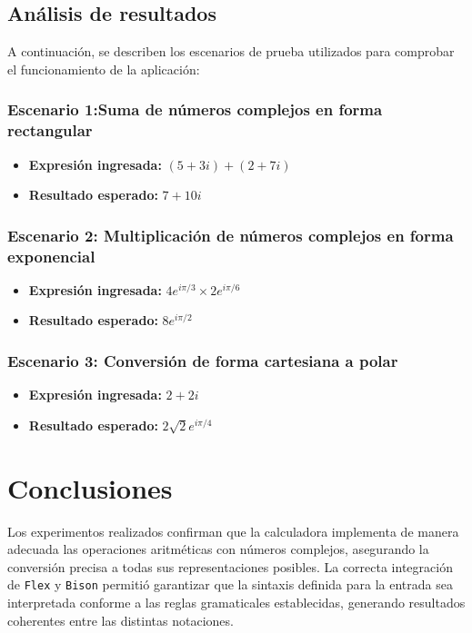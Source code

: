 \documentclass{article}
\begin{document}
\subsection{Análisis de resultados}

A continuación, se describen los escenarios de prueba utilizados para comprobar el funcionamiento de la aplicación:

\subsubsection{Escenario 1:Suma de números complejos en forma rectangular}

\begin{itemize}
    \item \textbf{Expresión ingresada:} $(5 + 3i) + (2 + 7i)$
    \item \textbf{Resultado esperado:} $7 + 10i$
\end{itemize}


\subsubsection{Escenario 2: Multiplicación de números complejos en forma exponencial}

\begin{itemize}
    \item \textbf{Expresión ingresada:} $4e^{i\pi/3} \times 2e^{i\pi/6}$
    \item \textbf{Resultado esperado:} $8e^{i\pi/2}$
\end{itemize}
 
\subsubsection{Escenario 3: Conversión de forma cartesiana a polar}

\begin{itemize}
    \item \textbf{Expresión ingresada:} $2 + 2i$
    \item \textbf{Resultado esperado:} $2\sqrt{2}e^{i\pi/4}$
\end{itemize}

\section*{Conclusiones}

Los experimentos realizados confirman que la calculadora implementa de manera adecuada las operaciones aritméticas con números complejos, asegurando la conversión precisa a todas sus representaciones posibles. La correcta integración de \texttt{Flex} y \texttt{Bison} permitió garantizar que la sintaxis definida para la entrada sea interpretada conforme a las reglas gramaticales establecidas, generando resultados coherentes entre las distintas notaciones.
\end{document}
